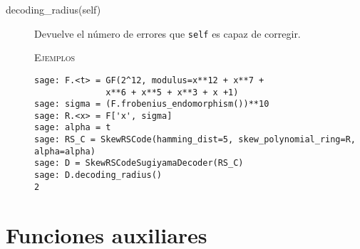 \begin{description}
\begin{description}
        \item[decoding\_radius(self)]
        Devuelve el número de errores que \texttt{self} es capaz de corregir.

        \textsc{Ejemplos}
        \begin{lstlisting}
sage: F.<t> = GF(2^12, modulus=x**12 + x**7 +
              x**6 + x**5 + x**3 + x +1)
sage: sigma = (F.frobenius_endomorphism())**10
sage: R.<x> = F['x', sigma]
sage: alpha = t
sage: RS_C = SkewRSCode(hamming_dist=5, skew_polynomial_ring=R, alpha=alpha)
sage: D = SkewRSCodeSugiyamaDecoder(RS_C)
sage: D.decoding_radius()
2
        \end{lstlisting}
    \end{description}
\end{description}

\section{Funciones auxiliares}

